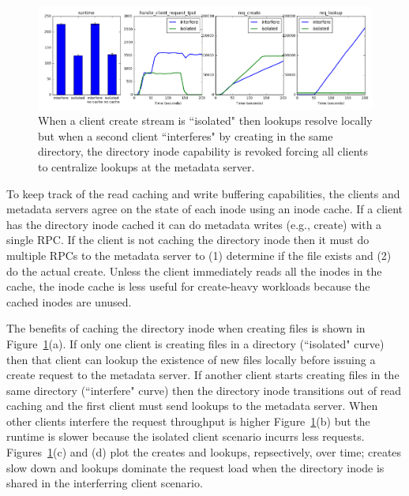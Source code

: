 \begin{figure}[tb]%
\centering
\includegraphics[width=180mm]{figures/throughput-droplease.png}
\caption{When a client create stream is ``isolated" then lookups resolve
locally but when a second client ``interferes" by creating in the same directory,
the directory inode capability is revoked forcing all clients to centralize
lookups at the metadata server.  \label{fig:throughput-droplease}}
\end{figure}

To keep track of the read caching and write buffering capabilities, the clients
and metadata servers agree on the state of each inode using an inode cache.  If
a client has the directory inode cached it can do metadata writes (e.g.,
create) with a single RPC. If the client is not caching the directory inode
then it must do multiple RPCs to the metadata server to (1) determine if the
file exists and (2) do the actual create.  Unless the client immediately reads
all the inodes in the cache, the inode cache is less useful for create-heavy
workloads because the cached inodes are unused. 

The benefits of caching the directory inode when creating files is shown in
Figure~\ref{fig:throughput-droplease}(a).  If only one client is creating files
in a directory (``isolated" curve) then that client can lookup the existence of
new files locally before issuing a create request to the metadata server. If
another client starts creating files in the same directory (``interfere" curve)
then the directory inode transitions out of read caching and the first client
must send lookups to the metadata server. When other clients interfere the
request throughput is higher Figure~\ref{fig:throughput-droplease}(b) but the
runtime is slower because the isolated client scenario incurrs less requests.
Figures~\ref{fig:throughput-droplease}(c) and (d) plot the creates and lookups,
repsectively, over time; creates slow down and lookups dominate the request
load when the directory inode is shared in the interferring client scenario.

